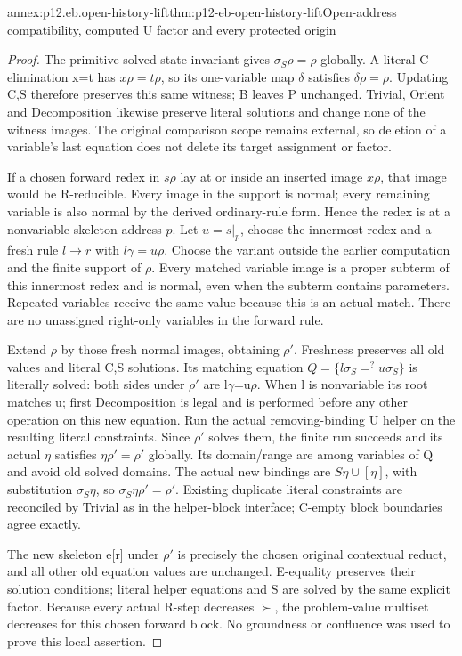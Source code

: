 \begin{annexitem}{annex:p12.eb.open-history-lift}{thm:p12-eb-open-history-lift}{Open-address compatibility, computed U factor and every protected origin}
\begin{proof}
The primitive solved-state invariant gives
\(\sigma_S\rho=\rho\) globally. A literal C elimination
x=t has \(x\rho=t\rho\), so its one-variable map
\(\delta\) satisfies \(\delta\rho=\rho\). Updating C,S
therefore preserves this same witness; B leaves P unchanged.
Trivial, Orient and Decomposition likewise preserve literal
solutions and change none of the witness images. The original
comparison scope remains external, so deletion of a variable's
last equation does not delete its target assignment or factor.

If a chosen forward redex in \(s\rho\) lay at or inside an
inserted image \(x\rho\), that image would be R-reducible.
Every image in the support is normal; every remaining variable
is also normal by the derived ordinary-rule form. Hence the
redex is at a nonvariable skeleton address \(p\). Let \(u=s|_p\),
choose the innermost redex and a fresh rule \(l\to r\) with
\(l\gamma=u\rho\). Choose the variant outside the earlier
computation and the finite support of \(\rho\).
Every matched variable image is a proper subterm of this
innermost redex and is normal, even when the subterm contains
parameters. Repeated variables receive the same value because
this is an actual match. There are no unassigned right-only
variables in the forward rule.

Extend \(\rho\) by those fresh normal images, obtaining
\(\rho'\). Freshness preserves all old values and literal
C,S solutions. Its matching equation
\(Q=\{l\sigma_S=^{?}u\sigma_S\}\) is literally solved:
both sides under \(\rho'\) are l\(\gamma\)=u\(\rho\).
When l is nonvariable its root matches u; first Decomposition
is legal and is performed before any other operation on this
new equation. Run the actual removing-binding U helper on the
resulting literal constraints. Since \(\rho'\) solves them,
the finite run succeeds and its actual \(\eta\) satisfies
\(\eta\rho'=\rho'\) globally. Its domain/range are among
variables of Q and avoid old solved domains. The actual new
bindings are \(S\eta\cup[\eta]\), with substitution
\(\sigma_S\eta\), so
\(\sigma_S\eta\rho'=\rho'\). Existing duplicate literal
constraints are reconciled by Trivial as in the helper-block
interface; C-empty block boundaries agree exactly.

The new skeleton e[r] under \(\rho'\) is precisely the
chosen original contextual reduct, and all other old equation
values are unchanged. E-equality preserves their solution
conditions; literal helper equations and S are solved by the
same explicit factor. Because every actual R-step decreases
\(\succ\), the problem-value multiset decreases for this
chosen forward block. No groundness or confluence was used
to prove this local assertion.


\end{proof}
\end{annexitem}
